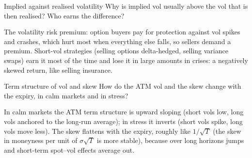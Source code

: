 \begin{question}{\Theory {}}{Implied against realised volatility}
Why is implied vol usually above the vol that is then realised? Who earns the difference?
\end{question}
\begin{answer}
The volatility risk premium: option buyers pay for protection against vol spikes and crashes, which hurt most when
everything else falls, so sellers demand a premium. Short-vol strategies (selling options delta-hedged, selling
variance swaps) earn it most of the time and lose it in large amounts in crises: a negatively skewed return, like
selling insurance.
\end{answer}

\begin{question}{\Theory {}}{Term structure of vol and skew}
How do the ATM vol and the skew change with the expiry, in calm markets and in stress?
\end{question}
\begin{answer}
In calm markets the ATM term structure is upward sloping (short vols low, long vols anchored to the long-run
average); in stress it inverts (short vols spike, long vols move less). The skew flattens with the expiry, roughly
like $1/\sqrt T$ (the skew in moneyness per unit of $\sigma\sqrt T$ is more stable), because over long horizons jumps
and short-term spot--vol effects average out.
\end{answer}

